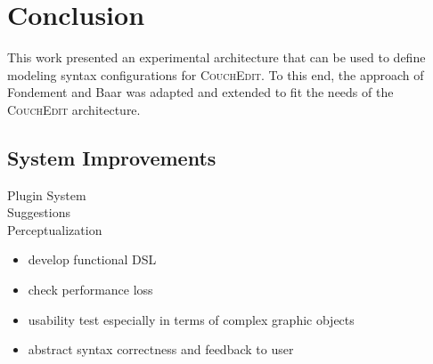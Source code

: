 \chapter{Conclusion}
\label{ch:conclusion}

This work presented an experimental architecture that can be used to define modeling syntax configurations for \textsc{CouchEdit}. To this end, the approach of Fondement and Baar \cite{fondement_making_2005} was adapted and extended to fit the needs of the \textsc{CouchEdit} architecture. 


\section{System Improvements}


\begin{description}
  \item[Plugin System]
  \item[Suggestions] 
  \item[Perceptualization]  
\end{description}

\begin{itemize}
  \item develop functional DSL
  \item check performance loss
  \item usability test especially in terms of complex graphic objects
  \item abstract syntax correctness and feedback to user
\end{itemize}

